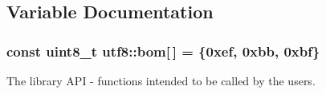 \subsection{Variable Documentation}
\subsubsection[{bom}]{\setlength{\rightskip}{0pt plus 5cm}const {\bf uint8\+\_\+t} utf8\+::bom\mbox{[}$\,$\mbox{]} = \{0xef, 0xbb, 0xbf\}}\hypertarget{namespaceutf8_ac7efcab62f51d362fc741657e60b9b1d}{}\label{namespaceutf8_ac7efcab62f51d362fc741657e60b9b1d}


The library A\+PI -\/ functions intended to be called by the users. 

